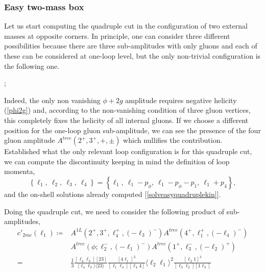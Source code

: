 \subsubsection{Easy two-mass box}
Let us start computing the quadruple cut in the configuration of two external masses at opposite corners. In principle, one can consider three different possibilities because there are three sub-amplitudes with only gluons and each of these can be considered at one-loop level, but the only non-trivial configuration is the following one.
\begin{paracol}{2}
\begin{center}
;
\end{center}
\switchcolumn
Indeed, the only non vanishing $\phi+2g$ amplitude requires negative helicity (\ref{phi2g}) and, according to the non-vanishing condition of three gluon vertices, this completely fixes the helicity of all internal gluons. If we choose a different position for the one-loop gluon sub-amplitude, we can see the presence of the four gluon amplitude $A^{tree}(2^+,3^+,+,\pm)$ which nullifies the contribution.\\
Established what the only relevant loop configuration is for this quadruple cut, we can compute the discontinuity keeping in mind the definition of loop momenta,
$$
	\left\{\ell_1,\ \ell_2,\ \ell_3,\ \ell_4\right\}=\left\{\ell_1,\ \ell_1-p_\phi,\ \ell_1-p_\phi-p_1,\ \ell_1+p_4\right\},
$$
and the on-shell solutions already computed [\ref{solveasyquadruplekin}].
\end{paracol}
Doing the quadruple cut, we need to consider the following product of sub-amplitudes,
\begin{align*}
	c'_{2me}(\ell_1)\coloneqq &A^{1L}(2^+,3^+,\ell_4^+,(-\ell_3)^-)A^{tree}(4^+,\ell_1^+,(-\ell_4)^-)\\
	&A^{tree}(\phi;\ell_2^-,(-\ell_1)^-)A^{tree}(1^+,\ell_3^-,(-\ell_2)^+)\\
	=&\frac{1}{3}\frac{[\ell_4\ell_3][23]}{\langle \ell_4 \ell_3\rangle \langle 23 \rangle}\frac{[4\ell_1]^3}{[\ell_1\ell_4][\ell_4 4]} \langle\ell_2\ell_1 \rangle^2\frac{[\ell_2 1]^3}{[\ell_3 \ell_2][1\ell_3]}
\end{align*}
